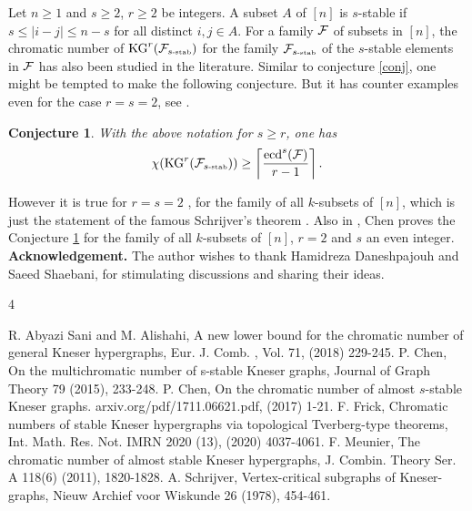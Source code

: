 \documentclass[a4paper,11pt]{article}
\newtheorem{conjecture}{Conjecture}[section]
\begin{document}
Let $n\ge 1$ and $s\ge 2$, $r\ge 2$ be integers. A subset $A$ of $[n]$ is $s$-stable if $s\le |i-j|\le n-s$ for all distinct $i,j\in A$. For a family $\cal F$ of subsets in $[n]$, the chromatic number of
$\mbox{KG}^r({\cal F}_{s\tiny{\mbox{-stab}}})$ for the family ${\cal F}_{s\tiny{\mbox{-stab}}}$ of the $s$-stable elements in $\cal F$ has also been studied in the literature. Similar to conjecture \ref{conj}, one might be tempted to make the following conjecture.
But it has counter examples even for the case $r=s=2$, see \cite{F}.

\begin{conjecture}\label{conj2}
With the above notation for $s\ge r$, one has
\[\chi(\mbox{KG}^r({\cal F}_{s\tiny{\mbox{-stab}}}))\ge \left\lceil \frac{\mbox{ecd}^s({\cal F})}{r-1}\right\rceil.\]
\end{conjecture}
However it is true for $r=s=2$ , for the family of all $k$-subsets of $[n]$, which is just the statement of the famous Schrijver's theorem \cite{S}. Also in \cite{C1}, Chen proves the Conjecture \ref{conj2} for the family of all $k$-subsets of $[n]$, $r=2$ and $s$ an even integer. 
\\
{\textbf{Acknowledgement.}} The author wishes to thank Hamidreza Daneshpajouh and Saeed Shaebani, for stimulating discussions and sharing their ideas.

\begin{thebibliography}{4}


%

 R. Abyazi Sani and M. Alishahi, A new lower  bound for the chromatic number of general Kneser hypergraphs, Eur. J. Comb. , Vol. 71, (2018) 229-245.
 P. Chen, On the multichromatic number of s-stable Kneser graphs, Journal of Graph Theory 79 (2015), 233-248.
 P. Chen, On the chromatic number of almost $s$-stable Kneser graphs. arxiv.org/pdf/1711.06621.pdf, (2017) 1-21.
 F. Frick, Chromatic numbers of stable Kneser hypergraphs via topological Tverberg-type theorems,
Int. Math. Res. Not. IMRN 2020 (13),  (2020) 4037-4061.
 F. Meunier, The chromatic number of almost stable Kneser hypergraphs, J. Combin. Theory Ser. A 118(6) (2011), 1820-1828.
 A. Schrijver, Vertex-critical subgraphs of Kneser-graphs, Nieuw Archief voor Wiskunde 26 (1978), 454-461.
\end{thebibliography}
\end{document}
